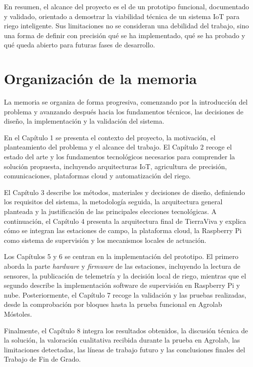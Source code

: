 En resumen, el alcance del proyecto es el de un prototipo funcional, documentado y validado, orientado a demostrar la viabilidad técnica de un sistema IoT para riego inteligente. Sus limitaciones no se consideran una debilidad del trabajo, sino una forma de definir con precisión qué se ha implementado, qué se ha probado y qué queda abierto para futuras fases de desarrollo.

\section{Organización de la memoria}
\label{sec:organizacion_memoria}

La memoria se organiza de forma progresiva, comenzando por la introducción del problema y avanzando después hacia los fundamentos técnicos, las decisiones de diseño, la implementación y la validación del sistema.

En el Capítulo 1 se presenta el contexto del proyecto, la motivación, el planteamiento del problema y el alcance del trabajo. El Capítulo 2 recoge el estado del arte y los fundamentos tecnológicos necesarios para comprender la solución propuesta, incluyendo arquitecturas IoT, agricultura de precisión, comunicaciones, plataformas cloud y automatización del riego.

El Capítulo 3 describe los métodos, materiales y decisiones de diseño, definiendo los requisitos del sistema, la metodología seguida, la arquitectura general planteada y la justificación de las principales elecciones tecnológicas. A continuación, el Capítulo 4 presenta la arquitectura final de TierraViva y explica cómo se integran las estaciones de campo, la plataforma cloud, la Raspberry Pi como sistema de supervisión y los mecanismos locales de actuación.

Los Capítulos 5 y 6 se centran en la implementación del prototipo. El primero aborda la parte \textit{hardware} y \textit{firmware} de las estaciones, incluyendo la lectura de sensores, la publicación de telemetría y la decisión local de riego, mientras que el segundo describe la implementación software de supervisión en Raspberry Pi y nube. Posteriormente, el Capítulo 7 recoge la validación y las pruebas realizadas, desde la comprobación por bloques hasta la prueba funcional en Agrolab Móstoles.

Finalmente, el Capítulo 8 integra los resultados obtenidos, la discusión técnica de la solución, la valoración cualitativa recibida durante la prueba en Agrolab, las limitaciones detectadas, las líneas de trabajo futuro y las conclusiones finales del Trabajo de Fin de Grado.
